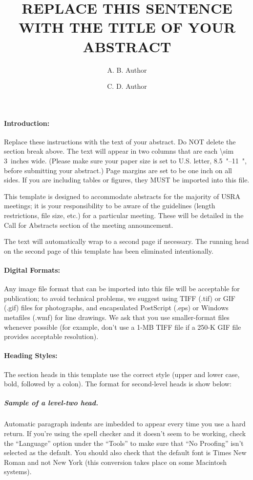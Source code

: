 \documentclass{lpsc_abstract}
\title{REPLACE THIS SENTENCE WITH THE TITLE OF YOUR ABSTRACT}
\author[1]{A. B. Author}
\author[2]{C. D. Author}
\affil[1]{Affiliation (include full mailing address and e-mail address if desired) for first author}
\affil[2]{Affiliation for second author (full mailing address and e-mail address)}
\begin{document}
\maketitle

\paragraph{Introduction:}
Replace these instructions with the text of your abstract.
Do NOT delete the section break above.
The text will appear in two columns that are each \SI{\sim 3}{inches} wide.
(Please make sure your paper size is set to U.S. letter, \SIrange[range-phrase=$\times$]{8.5}{11}{"}, before submitting your abstract.)
Page margins are set to be one inch on all sides.
If you are including tables or figures, they MUST be imported into this file.

This template is designed to accommodate abstracts for the majority of USRA meetings; it is your responsibility to be aware of the guidelines (length restrictions, file size, etc.) for a particular meeting. These will be detailed in the Call for Abstracts section of the meeting announcement.

The text will automatically wrap to a second page if necessary. The running head on the second page of this template has been eliminated intentionally.

\paragraph{Digital Formats:}
Any image file format that can be imported into this file will be acceptable for publication; to avoid technical problems, we suggest using TIFF (.tif) or GIF (.gif) files for photographs, and encapsulated PostScript (.eps) or Windows metafiles (.wmf) for line drawings.
We ask that you use smaller-format files whenever possible (for example, don’t use a 1-MB TIFF file if a 250-K GIF file provides acceptable resolution).

\paragraph{Heading Styles:}
The section heads in this template use the correct style (upper and lower case, bold, followed by a colon). The format for second-level heads is show below:

\subparagraph{Sample of a level-two head.}
Automatic paragraph indents are imbedded to appear every time you use a hard return. If you’re using the spell checker and it doesn’t seem to be working, check the “Language” option under the “Tools” to make sure that “No Proofing” isn’t selected as the default. You should also check that the default font is Times New Roman and not New York (this conversion takes place on some Macintosh systems).
\end{document}
